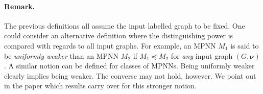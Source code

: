 \paragraph{Remark.} The previous definitions all assume the input labelled graph to be fixed. One could consider an alternative definition where the distinguishing power is compared with regards to all
input graphs. For example, an MPNN $M_1$ is said to be \textit{uniformly weaker} than an MPNN $M_2$ if $M_1\preceq M_2$ for \textit{any} input graph $( G,\pmb{\nu})$. A similar notion can be defined for classes of MPNNs. Being uniformly weaker clearly implies being weaker. The converse may not hold, however. We point out in the paper which results carry over for this stronger notion.

